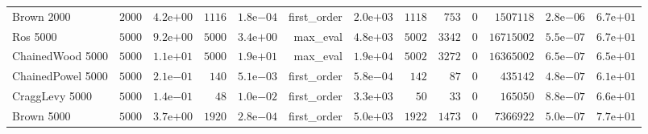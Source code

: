 \begin{longtable}[c]{lrrrrrrrrrrrr}
Brown 2000 & \( 2000\) & \( 4.2\)e\(+00\) & \( 1116\) & \( 1.8\)e\(-04\) & first\_order & \( 2.0\)e\(+03\) & \( 1118\) & \(  753\) & \(    0\) & \(1507118\) & \( 2.8\)e\(-06\) & \( 6.7\)e\(+01\) \\
Ros 5000 & \( 5000\) & \( 9.2\)e\(+00\) & \( 5000\) & \( 3.4\)e\(+00\) & max\_eval & \( 4.8\)e\(+03\) & \( 5002\) & \( 3342\) & \(    0\) & \(16715002\) & \( 5.5\)e\(-07\) & \( 6.7\)e\(+01\) \\
ChainedWood 5000 & \( 5000\) & \( 1.1\)e\(+01\) & \( 5000\) & \( 1.9\)e\(+01\) & max\_eval & \( 1.9\)e\(+04\) & \( 5002\) & \( 3272\) & \(    0\) & \(16365002\) & \( 6.5\)e\(-07\) & \( 6.5\)e\(+01\) \\
ChainedPowel 5000 & \( 5000\) & \( 2.1\)e\(-01\) & \(  140\) & \( 5.1\)e\(-03\) & first\_order & \( 5.8\)e\(-04\) & \(  142\) & \(   87\) & \(    0\) & \(435142\) & \( 4.8\)e\(-07\) & \( 6.1\)e\(+01\) \\
CraggLevy 5000 & \( 5000\) & \( 1.4\)e\(-01\) & \(   48\) & \( 1.0\)e\(-02\) & first\_order & \( 3.3\)e\(+03\) & \(   50\) & \(   33\) & \(    0\) & \(165050\) & \( 8.8\)e\(-07\) & \( 6.6\)e\(+01\) \\
Brown 5000 & \( 5000\) & \( 3.7\)e\(+00\) & \( 1920\) & \( 2.8\)e\(-04\) & first\_order & \( 5.0\)e\(+03\) & \( 1922\) & \( 1473\) & \(    0\) & \(7366922\) & \( 5.0\)e\(-07\) & \( 7.7\)e\(+01\) \\
\hline 
\end{longtable}



